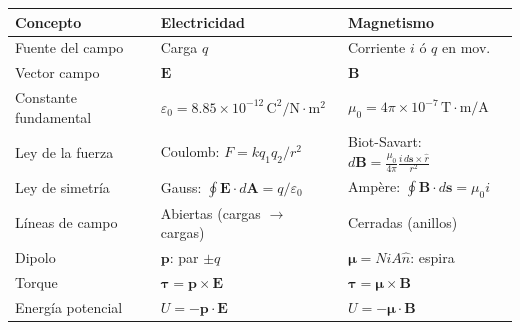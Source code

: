 \documentclass[12pt, letterpaper]{report}
\numberwithin{equation}{section}
\newcommand{\vB}[1]{\boldsymbol{#1}}          %
\newcommand{\un}[1]{\,\mathrm{#1}}            %
\begin{document}
\begin{center}
\renewcommand{\arraystretch}{1.6}
\begin{tabular}{p{}p{}p{}}
  \toprule
  \textbf{Concepto} &
  \textbf{Electricidad} &
  \textbf{Magnetismo} \\
  \midrule
  Fuente del campo &
  Carga $q$ &
  Corriente $i$ ó $q$ en mov. \\
  Vector campo &
  $\vB{E}$ &
  $\vB{B}$ \\
  Constante fundamental &
  $\varepsilon_0=8.85\times10^{-12}\un{C^2/N\cdot m^2}$ &
  $\mu_0=4\pi\times10^{-7}\un{T\cdot m/A}$ \\
  Ley de la fuerza &
  Coulomb: $F=kq_1q_2/r^2$ &
  Biot-Savart: $d\vB{B}=\frac{\mu_0}{4\pi}\frac{i\,d\vB{s}\times\hat{r}}{r^2}$\\
  Ley de simetría &
  Gauss: $\oint\vB{E}\cdot d\vB{A}=q/\varepsilon_0$ &
  Ampère: $\oint\vB{B}\cdot d\vB{s}=\mu_0 i$ \\
  Líneas de campo &
  Abiertas (cargas $\to$ cargas) &
  Cerradas (anillos) \\
  Dipolo &
  $\vB{p}$: par $\pm q$ &
  $\vB{\mu}=Ni A\hat{n}$: espira \\
  Torque &
  $\vB{\tau}=\vB{p}\times\vB{E}$ &
  $\vB{\tau}=\vB{\mu}\times\vB{B}$ \\
  Energía potencial &
  $U=-\vB{p}\cdot\vB{E}$ &
  $U=-\vB{\mu}\cdot\vB{B}$ \\
  \bottomrule
\end{tabular}
\end{center}

\end{document}
